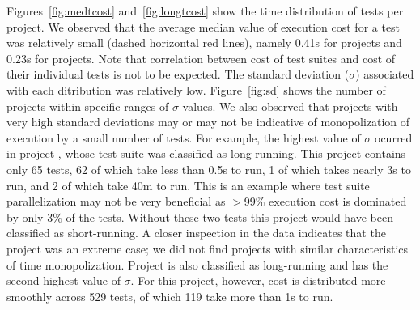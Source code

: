 \sloppy Figures~\ref{fig:medtcost} and~\ref{fig:longtcost} show the
time distribution of tests per project.  We observed that the average
median value of execution cost for a test was relatively small (dashed
horizontal red lines), namely 0.41s for \medg{} projects and 0.23s for
\longg{} projects.  Note that correlation between cost of test suites
and cost of their individual tests is not to be expected.  The
standard deviation ($\sigma$) associated with each ditribution was
relatively low.  Figure~\ref{fig:sd} shows the number of projects
within specific ranges of $\sigma$ values.  We also observed that
projects with very high standard deviations may or may not be
indicative of monopolization of execution by a small number of tests.
For example, the highest value of $\sigma$ ocurred in project
, whose test suite was classified as
long-running.  This project contains only 65 tests, 62 of which take
less than 0.5s to run, 1 of which takes nearly 3s to run, and 2 of
which take 40m to run.  This is an example where test suite
parallelization may not be very beneficial as $>$99\% execution cost
is dominated by only 3\% of the tests.  Without these two tests this
project would have been classified as short-running.  A closer
inspection in the data indicates that the project
 was an extreme case; we did not find projects
with similar characteristics of time monopolization.  Project
 is also classified as
long-running and has the second highest value of $\sigma$.  For this
project, however, cost is distributed more smoothly across 529 tests,
of which 119 take more than 1s to run.  

\begin{center}
\end{center}


